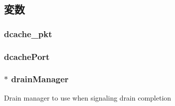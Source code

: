 \subsection{変数}
\hypertarget{classTimingSimpleCPU_a8cdf6dfb358a155d5422c09f961297fe}{
\subsubsection[{dcache\_\-pkt}]{ {\bf dcache\_\-pkt}}}
\label{classTimingSimpleCPU_a8cdf6dfb358a155d5422c09f961297fe}
\hypertarget{classTimingSimpleCPU_a38b03978ad7720fdc910ff6a8b44585f}{
\subsubsection[{dcachePort}]{ {\bf dcachePort}}}
\label{classTimingSimpleCPU_a38b03978ad7720fdc910ff6a8b44585f}
\hypertarget{classTimingSimpleCPU_a329b71fb934a93312ca0aacbf5a3f982}{
\subsubsection[{drainManager}]{$\ast$ {\bf drainManager}}}
\label{classTimingSimpleCPU_a329b71fb934a93312ca0aacbf5a3f982}
Drain manager to use when signaling drain completion

